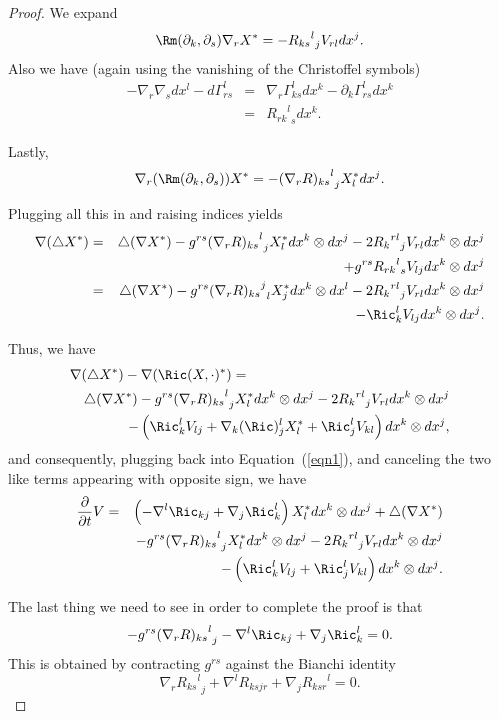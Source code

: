 \begin{proof}
We expand
$$\Rm(\partial_k,\partial_s)\nabla_rX^* =-{{R_{ks}}^{l}}_jV_{rl}dx^j.$$
Also we have (again using the vanishing of the Christoffel symbols)
\begin{eqnarray*}
-\nabla_r\nabla_sdx^l-d\Gamma_{rs}^l & = &
\nabla_r\Gamma_{ks}^ldx^k-\partial_k\Gamma_{rs}^ldx^k \\
& = & {{R_{rk}}^l}_s dx^k.
\end{eqnarray*}

Lastly,
\begin{eqnarray*}
\nabla_r(\Rm(\partial_k,\partial_s))X^*=-{{(\nabla_rR)_{ks}}^l}_jX^*_ldx^j.
\end{eqnarray*}


Plugging all this in and raising indices yields
\begin{eqnarray*}
\nabla(\triangle X^*) & = & \triangle(\nabla X^*)-
g^{rs}{{(\nabla_rR)_{ks}}^l}_jX^*_ldx^k\otimes
dx^j-2{{R_k}^{rl}}_jV_{rl}dx^k\otimes dx^j \\
& &  +
g^{rs}{{R_{rk}}^l}_sV_{lj}dx^k\otimes dx^j \\
& = & \triangle(\nabla X^*)- g^{rs}{{(\nabla_rR)_{ks}}^j}_lX^*_jdx^k\otimes
dx^l-2{{R_k}^{rl}}_jV_{rl}dx^k\otimes dx^j  \\
& & -\Ric_k^lV_{lj}dx^k\otimes dx^j.
\end{eqnarray*}

Thus, we have
\begin{eqnarray*}
\lefteqn{\nabla(\triangle X^*) -\nabla(\Ric(X,\cdot)^*)=} \\ &  &
\triangle(\nabla X^*)- g^{rs}{{(\nabla_rR)_{ks}}^l}_jX^*_ldx^k\otimes
dx^j-2{{R_k}^{rl}}_jV_{rl}dx^k\otimes dx^j
\\
& & -\left(\Ric_k^lV_{lj}+\nabla_k(\Ric)_j^lX^*_l+\Ric_j^lV_{kl}\right)dx^k\otimes dx^j,
\end{eqnarray*}
and consequently, plugging back into Equation~(\ref{eqn1}), and
canceling the two like terms appearing with opposite sign, we have
\begin{eqnarray*}
\frac{\partial}{\partial t}V  & = & \left(-\nabla^{l}\Ric_{kj}+\nabla_{j}\Ric_k^l\right)X^*_{l}dx^k\otimes
dx^j +\triangle(\nabla X^*) \\
& & -g^{rs}{{(\nabla_rR)_{ks}}^l}_jX^*_ldx^k\otimes
dx^j-2{{R_k}^{rl}}_jV_{rl}dx^k\otimes dx^j
\\
& & -\left(\Ric_k^lV_{lj}+\Ric_j^lV_{kl}\right)dx^k\otimes
dx^j.
\end{eqnarray*}


The last thing we need to see in order to complete the proof is that
$$-g^{rs}{{(\nabla_rR)_{ks}}^l}_j-\nabla^{l}\Ric_{kj}+\nabla_{j}\Ric_k^l=0.$$
This is obtained by  contracting $g^{rs}$ against the Bianchi
identity
$$\nabla_r{{R_{ks}}^l}_j+\nabla^lR_{ksjr}+\nabla_j{R_{ksr}}^l=0.$$
\end{proof}


